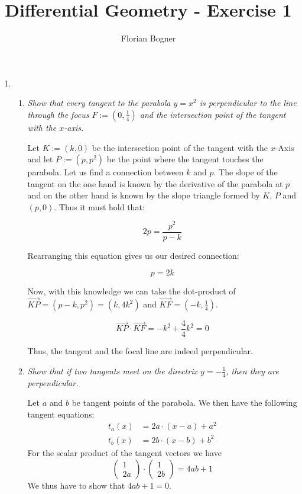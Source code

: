 \documentclass[a4paper,11pt,notitlepage,fullpage]{article}
\begin{document}
\author{Florian Bogner}
\title{Differential Geometry - Exercise 1}
\maketitle

\begin{enumerate}

\item
\begin{enumerate}
\item \emph{Show that every tangent to the parabola $y=x^2$ is perpendicular to the line through the focus $F := (0, \frac{1}{4})$ and the intersection point of the tangent with the $x$-axis.}

Let $K := (k, 0)$ be the intersection point of the tangent with the $x$-Axis and let $P := (p, p^2)$ be the point where the  tangent touches the parabola. Let us find a connection between $k$ and $p$. The slope of the tangent on the one hand is known by the derivative of the parabola at $p$ and on the other hand is known by the slope triangle formed by $K$, $P$ and $(p,0)$. Thus it must hold that:

\begin{equation*}
2p = \frac{p^2}{p-k}
\end{equation*}

Rearranging this equation gives us our desired connection:

\begin{equation*}
p = 2k
\end{equation*}

Now, with this knowledge we can take the dot-product of $\overrightarrow{KP} = (p-k, p^2) = (k, 4k^2)$ and $\overrightarrow{KF} = (-k, \frac{1}{4})$.

\begin{equation*}
\overrightarrow{KP} \cdot \overrightarrow{KF} = -k^2 + \frac{4}{4}k^2 = 0
\end{equation*}

Thus, the tangent and the focal line are indeed perpendicular.

\item \emph{Show that if two tangents meet on the directrix $y = -\frac{1}{4}$, then they are perpendicular.}

Let $a$ and $b$ be tangent points of the parabola. We then have the following tangent equations:
\begin{align*}
	t_a(x)&=2a\cdot (x-a)+a^2\\
	t_b(x)&=2b\cdot (x-b)+b^2
\end{align*}
For the scalar product of the tangent vectors we have
\begin{equation*}
\begin{pmatrix}
1 \\ 2a\end{pmatrix} \cdot \begin{pmatrix} 1 \\ 2b\end{pmatrix}=4ab+1
\end{equation*}
We thus have to show that $4ab+1=0$.


\end{enumerate}
\end{enumerate}
\end{document}
